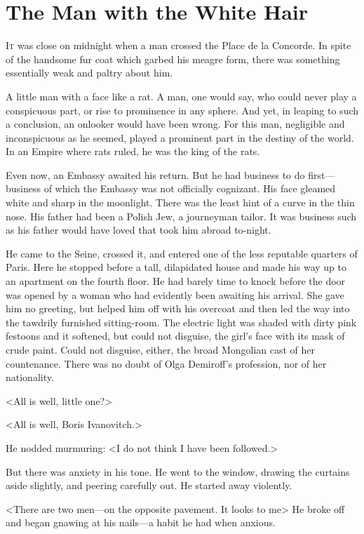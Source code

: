 \chapter{The Man with the White Hair}

\lettrine{I}{t} was close on midnight when a man crossed the Place de la Concorde. In spite of the handsome fur coat which garbed his meagre form, there was something essentially weak and paltry about him.

\zz
A little man with a face like a rat. A man, one would say, who could never play a conspicuous part, or rise to prominence in any sphere. And yet, in leaping to such a conclusion, an onlooker would have been wrong. For this man, negligible and inconspicuous as he seemed, played a prominent part in the destiny of the world. In an Empire where rats ruled, he was the king of the rats.

Even now, an Embassy awaited his return. But he had business to do first—business of which the Embassy was not officially cognizant. His face gleamed white and sharp in the moonlight. There was the least hint of a curve in the thin nose. His father had been a Polish Jew, a journeyman tailor. It was business such as his father would have loved that took him abroad to-night.

He came to the Seine, crossed it, and entered one of the less reputable quarters of Paris. Here he stopped before a tall, dilapidated house and made his way up to an apartment on the fourth floor. He had barely time to knock before the door was opened by a woman who had evidently been awaiting his arrival. She gave him no greeting, but helped him off with his overcoat and then led the way into the tawdrily furnished sitting-room. The electric light was shaded with dirty pink festoons and it softened, but could not disguise, the girl's face with its mask of crude paint. Could not disguise, either, the broad Mongolian cast of her countenance. There was no doubt of Olga Demiroff's profession, nor of her nationality.

<All is well, little one?>

<All is well, Boris Ivanovitch.>

He nodded murmuring: <I do not think I have been followed.>

But there was anxiety in his tone. He went to the window, drawing the curtains aside slightly, and peering carefully out. He started away violently.

<There are two men—on the opposite pavement. It looks to me\longdash> He broke off and began gnawing at his nails—a habit he had when anxious.

